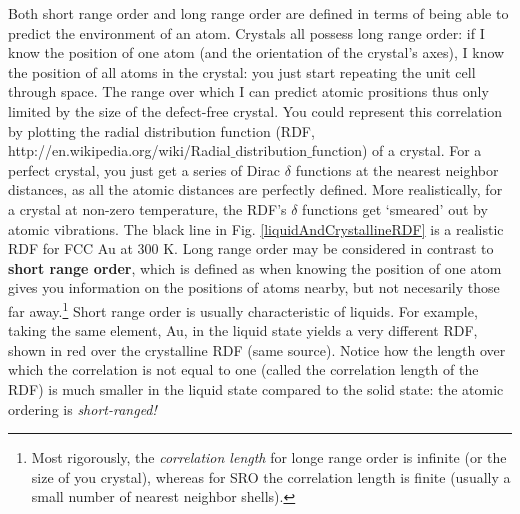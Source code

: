 \documentclass[12pt]{article}
\begin{document}
Both short range order and long range order are defined in terms of being able to predict the environment of an atom. Crystals all possess long range order: if I know the position of one atom (and the orientation of the crystal's axes), I know the position of all atoms in the crystal: you just
start repeating the unit cell through space. The range over which I can predict atomic prositions thus only limited by the size of the defect-free crystal. You could represent this correlation by plotting the radial distribution function (RDF, http://en.wikipedia.org/wiki/Radial$\_$distribution$\_$function)
of a crystal. For a perfect crystal, you just get a series of Dirac $\delta $ functions at the nearest neighbor distances, as all the atomic distances
are perfectly defined. More realistically, for a crystal at non-zero temperature, the RDF{'}s $\delta $ functions get {`}smeared{'} out by atomic
vibrations. The black line in Fig. \ref{liquidAndCrystallineRDF} is a realistic RDF for FCC Au at 300 K.
Long range order may be considered in contrast to \textbf{short range order}, which is defined as when knowing the position of one atom gives you information on the positions
of atoms nearby, but not necesarily those far away.\footnote{Most rigorously, the \emph{correlation length} for longe range order is infinite (or the size of you crystal), whereas for SRO the correlation length is finite (usually a small number of nearest neighbor shells).} Short range order is usually characteristic of liquids. For example, taking the same element,
Au, in the liquid state yields a very different RDF, shown in red over the crystalline RDF (same source). Notice how the length over which the correlation
is not equal to one (called the correlation length of the RDF) is much smaller in the liquid state compared to the solid state: the atomic ordering is \textit{short-ranged!} \par
\end{document}
